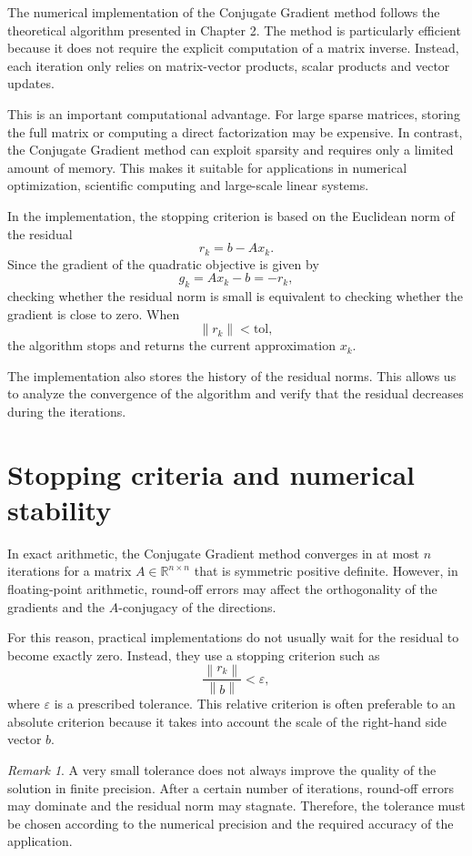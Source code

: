 \documentclass[11pt,a4paper]{report}
\theoremstyle{definition}
\theoremstyle{plain}
\theoremstyle{remark}
\newtheorem{remark}{Remark}[chapter]
\newcommand{\norm}[1]{\left\lVert #1 \right\rVert}
\begin{document}
The numerical implementation of the Conjugate Gradient method follows the theoretical algorithm presented in Chapter 2. The method is particularly efficient because it does not require the explicit computation of a matrix inverse. Instead, each iteration only relies on matrix-vector products, scalar products and vector updates.

This is an important computational advantage. For large sparse matrices, storing the full matrix or computing a direct factorization may be expensive. In contrast, the Conjugate Gradient method can exploit sparsity and requires only a limited amount of memory. This makes it suitable for applications in numerical optimization, scientific computing and large-scale linear systems.

In the implementation, the stopping criterion is based on the Euclidean norm of the residual
\[
r_k=b-Ax_k.
\]
Since the gradient of the quadratic objective is given by
\[
g_k=Ax_k-b=-r_k,
\]
checking whether the residual norm is small is equivalent to checking whether the gradient is close to zero. When
\[
\|r_k\|<\text{tol},
\]
the algorithm stops and returns the current approximation $x_k$.

The implementation also stores the history of the residual norms. This allows us to analyze the convergence of the algorithm and verify that the residual decreases during the iterations.

\section{Stopping criteria and numerical stability}

In exact arithmetic, the Conjugate Gradient method converges in at most $n$ iterations for a matrix $A\in\mathbb{R}^{n\times n}$ that is symmetric positive definite. However, in floating-point arithmetic, round-off errors may affect the orthogonality of the gradients and the $A$-conjugacy of the directions.

For this reason, practical implementations do not usually wait for the residual to become exactly zero. Instead, they use a stopping criterion such as
\[
\frac{\norm{r_k}}{\norm{b}}<\varepsilon,
\]
where $\varepsilon$ is a prescribed tolerance. This relative criterion is often preferable to an absolute criterion because it takes into account the scale of the right-hand side vector $b$.

\begin{remark}
A very small tolerance does not always improve the quality of the solution in finite precision. After a certain number of iterations, round-off errors may dominate and the residual norm may stagnate. Therefore, the tolerance must be chosen according to the numerical precision and the required accuracy of the application.
\end{remark}
\end{document}
